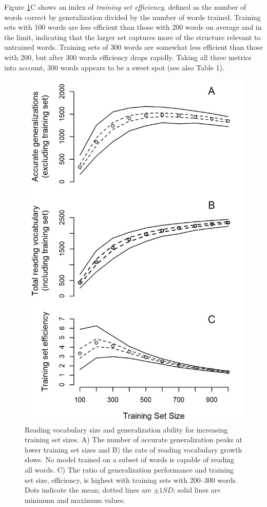 \documentclass[10pt,letterpaper]{article}
\begin{document}
Figure \ref{gen_by_setsize}C shows an index of \emph{training set efficiency}, defined as the number of words correct by generalization divided by the number of words trained. Training sets with 100 words are less efficient than those with 200 words on average and in the limit, indicating that the larger set captures more of the structure relevant to untrained words. Training sets of 300 words are somewhat less efficient than those with 200, but after 300 words efficiency drops rapidly. Taking all three metrics into account, 300 words appears to be a sweet spot (see also Table 1).

\begin{figure}[t]
	\includegraphics[width=0.9\columnwidth]{figures/generalization_by_setsize.png}

	\caption{Reading vocabulary size and generalization ability for increasing training set sizes. A) The number of accurate generalization peaks at lower training set sizes and B) the rate of reading vocabulary growth slows. No model trained on a subset of words is capable of reading all words. C) The ratio of generalization performance and training set size, efficiency, is highest with training sets with 200--300 words. Dots indicate the mean; dotted lines are $\pm 1 SD$; solid lines are minimum and maximum values.}
	
	\label{gen_by_setsize}
\end{figure}
\end{document}
